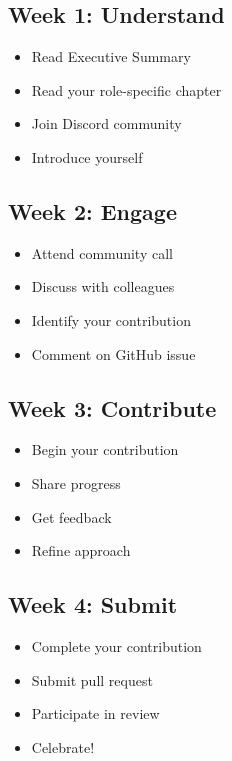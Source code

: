 \documentclass[12pt,a4paper,twoside,openright]{book}
\begin{document}
\subsection{Week 1: Understand}

\begin{itemize}
    \item[$\square$] Read Executive Summary
    \item[$\square$] Read your role-specific chapter
    \item[$\square$] Join Discord community
    \item[$\square$] Introduce yourself
\end{itemize}

\subsection{Week 2: Engage}

\begin{itemize}
    \item[$\square$] Attend community call
    \item[$\square$] Discuss with colleagues
    \item[$\square$] Identify your contribution
    \item[$\square$] Comment on GitHub issue
\end{itemize}

\subsection{Week 3: Contribute}

\begin{itemize}
    \item[$\square$] Begin your contribution
    \item[$\square$] Share progress
    \item[$\square$] Get feedback
    \item[$\square$] Refine approach
\end{itemize}

\subsection{Week 4: Submit}

\begin{itemize}
    \item[$\square$] Complete your contribution
    \item[$\square$] Submit pull request
    \item[$\square$] Participate in review
    \item[$\square$] Celebrate!
\end{itemize}
\end{document}
